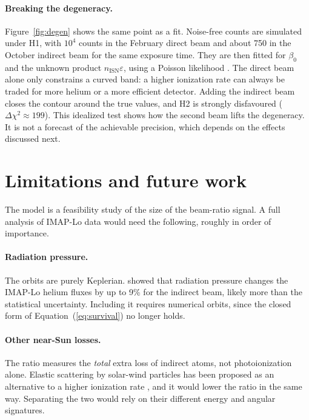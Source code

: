 \documentclass[10pt,a4paper,twocolumn]{article}
\newcommand{\nisn}{n_\mathrm{ISN}}
\begin{document}
\paragraph{Breaking the degeneracy.} Figure~\ref{fig:degen} shows the same
point as a fit. Noise-free counts are simulated under H1, with $10^4$ counts
in the February direct beam and about 750 in the October indirect beam for the
same exposure time. They are then fitted for $\beta_0$ and the unknown
product $\nisn\varepsilon$, using a Poisson likelihood
\citep{BakerCousins1984}. The direct beam alone only constrains a curved band:
a higher ionization rate can always be traded for more helium or a more
efficient detector. Adding the indirect beam closes the contour around the
true values, and H2 is strongly disfavoured ($\Delta\chi^2\approx199$). This
idealized test shows how the second beam lifts the degeneracy. It is not a
forecast of the achievable precision, which depends on the effects discussed
next.

\section{Limitations and future work}
\label{sec:limits}

The model is a feasibility study of the size of the beam-ratio signal. A full
analysis of IMAP-Lo data would need the following, roughly in order of
importance.

\paragraph{Radiation pressure.} The orbits are purely Keplerian.
\citet{KowalskaLeszczynska2023} showed that radiation pressure changes the
IMAP-Lo helium fluxes by up to 9\% for the indirect beam, likely more than the
statistical uncertainty. Including it requires numerical orbits, since the
closed form of Equation~(\ref{eq:survival}) no longer holds.

\paragraph{Other near-Sun losses.} The ratio measures the \emph{total} extra
loss of indirect atoms, not photoionization alone. Elastic scattering by
solar-wind particles has been proposed as an alternative to a higher
ionization rate \citep{ElasticScattering2024}, and it would lower the ratio
in the same way. Separating the two would rely on their different energy and
angular signatures.
\end{document}
